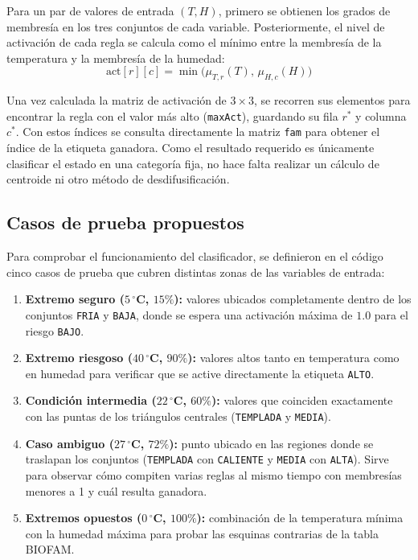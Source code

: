 \documentclass[conference]{IEEEtran}
\begin{document}
Para un par de valores de entrada \((T, H)\), primero se obtienen los grados de membresía en los tres conjuntos de cada variable. Posteriormente, el nivel de activación de cada regla se calcula como el mínimo entre la membresía de la temperatura y la membresía de la humedad:
\begin{equation}
    \text{act}[r][c] = \min\big(\mu_{T,r}(T),\, \mu_{H,c}(H)\big)
\end{equation}

Una vez calculada la matriz de activación de \(3 \times 3\), se recorren sus elementos para encontrar la regla con el valor más alto (\texttt{maxAct}), guardando su fila \(r^*\) y columna \(c^*\). Con estos índices se consulta directamente la matriz \texttt{fam} para obtener el índice de la etiqueta ganadora. Como el resultado requerido es únicamente clasificar el estado en una categoría fija, no hace falta realizar un cálculo de centroide ni otro método de desdifusificación.

\subsection{Casos de prueba propuestos}
Para comprobar el funcionamiento del clasificador, se definieron en el código cinco casos de prueba que cubren distintas zonas de las variables de entrada:
\begin{enumerate}
    \item \textbf{Extremo seguro (\(5\,^\circ\)C, \(15\%\)):} valores ubicados completamente dentro de los conjuntos \texttt{FRIA} y \texttt{BAJA}, donde se espera una activación máxima de \(1.0\) para el riesgo \texttt{BAJO}.
    \item \textbf{Extremo riesgoso (\(40\,^\circ\)C, \(90\%\)):} valores altos tanto en temperatura como en humedad para verificar que se active directamente la etiqueta \texttt{ALTO}.
    \item \textbf{Condición intermedia (\(22\,^\circ\)C, \(60\%\)):} valores que coinciden exactamente con las puntas de los triángulos centrales (\texttt{TEMPLADA} y \texttt{MEDIA}).
    \item \textbf{Caso ambiguo (\(27\,^\circ\)C, \(72\%\)):} punto ubicado en las regiones donde se traslapan los conjuntos (\texttt{TEMPLADA} con \texttt{CALIENTE} y \texttt{MEDIA} con \texttt{ALTA}). Sirve para observar cómo compiten varias reglas al mismo tiempo con membresías menores a 1 y cuál resulta ganadora.
    \item \textbf{Extremos opuestos (\(0\,^\circ\)C, \(100\%\)):} combinación de la temperatura mínima con la humedad máxima para probar las esquinas contrarias de la tabla BIOFAM.
\end{enumerate}
\end{document}
